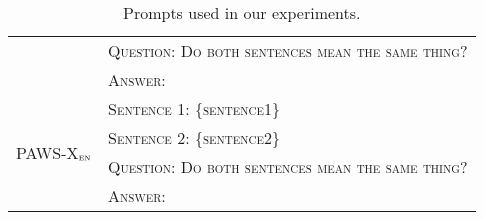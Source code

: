\begin{table*}[h!]
\begin{tabular}{p{}p{}}
  & \textsc{Question: Do both sentences mean the same thing?} \\
  & \textsc{Answer: } \\
  \midrule
  \multirow{4}{*}{PAWS-X$_{\textsc{en}}$ \citep{yang-etal-2019-paws}} &
  \textsc{Sentence 1: \{sentence1\}} \\ 
  & \textsc{Sentence 2: \{sentence2\}} \\
  & \textsc{Question: Do both sentences mean the same thing?} \\
  & \textsc{Answer: } \\
  \bottomrule
\end{tabular}
\caption{\label{table:prompts} Prompts used in our experiments.}
\end{table*}